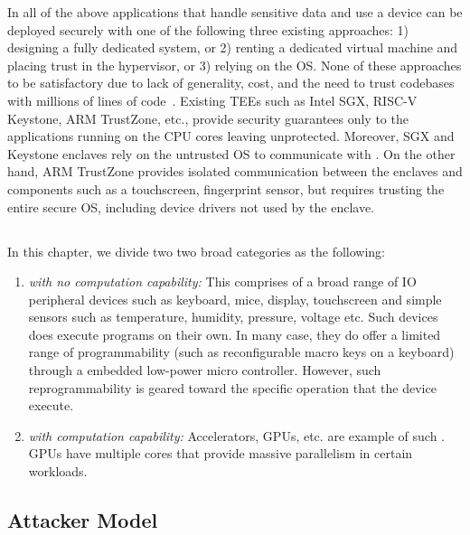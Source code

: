 In all of the above applications that handle sensitive data and use a \sphw device can be deployed securely with one of the following three existing approaches: 1) designing a fully dedicated system, or 2) renting a dedicated virtual machine and placing trust in the hypervisor, or 3) relying on the OS. None of these approaches to be satisfactory due to lack of generality, cost, and the need to trust codebases with millions of lines of code~\cite{torvalds2020linux,barham2003xen}. Existing TEEs such as Intel SGX, RISC-V Keystone, ARM TrustZone, etc., provide security guarantees only to the applications running on the CPU cores leaving \sphw unprotected. Moreover, SGX and Keystone enclaves rely on the untrusted OS to communicate with \sphw. On the other hand, ARM TrustZone provides isolated communication between the enclaves and components such as a touchscreen, fingerprint sensor, but requires trusting the entire secure OS, including device drivers not used by the enclave. 


\subsection{\Sphw}
\label{pie:sec:problemStatement:sphw}

In this chapter, we divide \sphw two two broad categories as the following:

\begin{enumerate}
\item \emph{\Sphw with no computation capability:} This comprises of a broad range of IO peripheral devices such as keyboard, mice, display, touchscreen and simple sensors such as temperature, humidity, pressure, voltage etc. Such devices does execute programs on their own. In many case, they do offer a limited range of programmability (such as reconfigurable macro keys on a keyboard) through a embedded low-power micro controller. However, such reprogrammability is geared toward the specific operation that the device execute. 

\item \emph{\Sphw with computation capability:} Accelerators, GPUs, etc. are example of such \sphw. GPUs have multiple cores that provide massive parallelism in certain workloads. 

\end{enumerate}

\subsection{Attacker Model}
\label{pie:sec:problemStatement:attackerModel}

